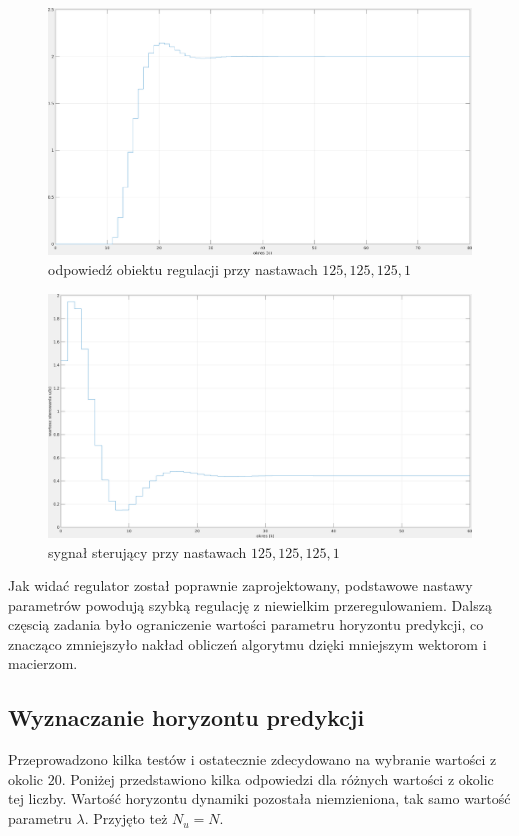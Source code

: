 \documentclass[fleqn]{article}
\begin{document}
\begin{figure}[H]
	\includegraphics[width=\textwidth]{scripts/regDDD.png}
	\caption{odpowiedź obiektu regulacji przy nastawach $125, 125, 125, 1$}
\end{figure}
\begin{figure}[H]
	\includegraphics[width=\textwidth]{scripts/regDDDster.png}
	\caption{sygnał sterujący przy nastawach $125, 125, 125, 1$}
	\label{}
\end{figure}

Jak widać regulator został poprawnie zaprojektowany, podstawowe nastawy parametrów powodują szybką regulację z niewielkim przeregulowaniem. Dalszą częscią zadania było ograniczenie wartości parametru horyzontu predykcji, co znacząco zmniejszyło nakład obliczeń algorytmu dzięki mniejszym wektorom i macierzom.

\subsection{Wyznaczanie horyzontu predykcji}


Przeprowadzono kilka testów i ostatecznie zdecydowano na wybranie wartości z okolic $20$. Poniżej przedstawiono kilka odpowiedzi dla różnych wartości z okolic tej liczby. Wartość horyzontu dynamiki pozostała niemzieniona, tak samo wartość parametru $\lambda$. Przyjęto też $N_u=N$.
\end{document}
